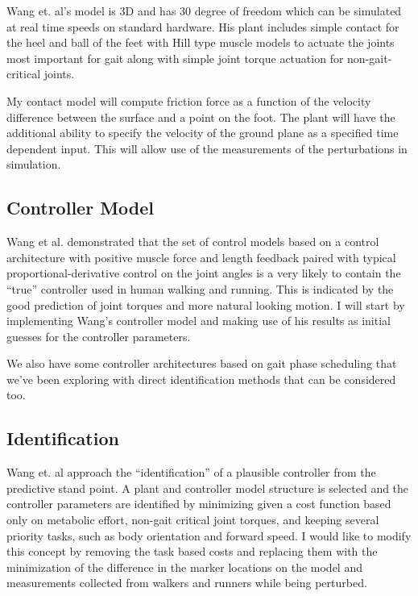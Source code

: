 \documentclass[11pt,twocolumn]{article}
\begin{document}
Wang et. al's model is 3D and has 30 degree of freedom which can be simulated
at real time speeds on standard hardware. His plant includes simple contact for
the heel and ball of the feet with Hill type muscle models to actuate the
joints most important for gait along with simple joint torque actuation for
non-gait-critical joints.

My contact model will compute friction force as a function of the velocity
difference between the surface and a point on the foot. The plant will have the
additional ability to specify the velocity of the ground plane as a specified
time dependent input. This will allow use of the measurements of the
perturbations in simulation.

\subsection*{Controller Model}

Wang et al. demonstrated that the set of control models based on a control
architecture with positive muscle force and length feedback paired with typical
proportional-derivative control on the joint angles is a very likely to contain
the ``true'' controller used in human walking and running. This is indicated by
the good prediction of joint torques and more natural looking motion. I will
start by implementing Wang's controller model and making use of his results as
initial guesses for the controller parameters.


We also have some controller architectures based on gait phase scheduling that
we've been exploring with direct identification methods that can be considered
too.

\subsection*{Identification}

Wang et. al  approach the ``identification'' of a plausible controller from the
predictive stand point. A plant and controller model structure is selected and
the controller parameters are identified by minimizing given a cost function
based only on metabolic effort, non-gait critical joint torques, and keeping
several priority tasks, such as body orientation and forward speed. I would
like to modify this concept by removing the task based costs and replacing them
with the minimization of the difference in the marker locations on the model
and measurements collected from walkers and runners while being perturbed.
\end{document}
